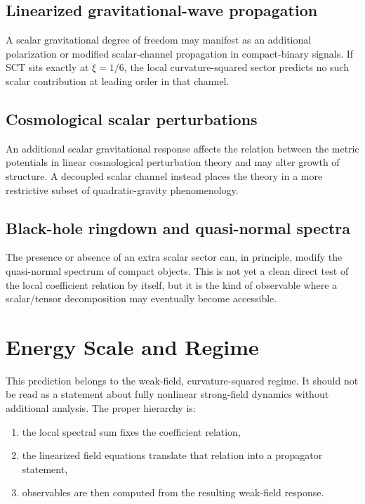 \documentclass[11pt,a4paper]{article}
\begin{document}
\subsection{Linearized gravitational-wave propagation}

A scalar gravitational degree of freedom may manifest as an additional
polarization or modified scalar-channel propagation in compact-binary
signals.  If SCT sits exactly at $\xi = 1/6$, the local curvature-squared
sector predicts no such scalar contribution at leading order in that channel.

\subsection{Cosmological scalar perturbations}

An additional scalar gravitational response affects the relation between the
metric potentials in linear cosmological perturbation theory and may alter
growth of structure.  A decoupled scalar channel instead places the theory in
a more restrictive subset of quadratic-gravity phenomenology.

\subsection{Black-hole ringdown and quasi-normal spectra}

The presence or absence of an extra scalar sector can, in principle, modify
the quasi-normal spectrum of compact objects.  This is not yet a clean direct
test of the local coefficient relation by itself, but it is the kind of
observable where a scalar/tensor decomposition may eventually become
accessible.

\section{Energy Scale and Regime}
\label{sec:scale}

This prediction belongs to the weak-field, curvature-squared regime.  It
should not be read as a statement about fully nonlinear strong-field dynamics
without additional analysis.  The proper hierarchy is:
\begin{enumerate}[label=\arabic*.]
  \item the local spectral sum fixes the coefficient relation,
  \item the linearized field equations translate that relation into a
  propagator statement,
  \item observables are then computed from the resulting weak-field response.
\end{enumerate}
\end{document}
